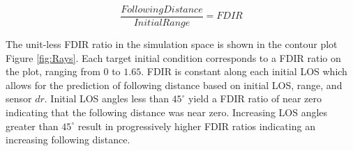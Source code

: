 \documentclass[conference]{IEEEtran}
\begin{document}



\begin{equation} 
\label{eq:FDIR}
\frac{Following Distance}{Initial Range} = FDIR
\end{equation}

The unit-less FDIR ratio in the simulation space is shown in the contour plot Figure \ref{fig:Rays}. Each target initial condition corresponds to a FDIR ratio on the plot, ranging from $0$ to $1.65$. FDIR is constant along each initial LOS which allows for the prediction of following distance based on initial LOS, range, and sensor $dr$. Initial LOS angles less than $45^{\circ}$ yield a FDIR ratio of near zero indicating that the following distance was near zero. Increasing LOS angles greater than $45^{\circ}$ result in progressively higher FDIR ratios indicating an increasing following distance.
\end{document}
